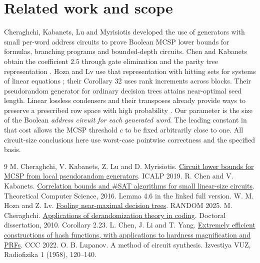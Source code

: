 \documentclass[11pt]{article}
\begin{document}
\section{Related work and scope}
Cheraghchi, Kabanets, Lu and Myrisiotis \cite{cklm} developed the use of generators with small per-word address circuits to prove Boolean MCSP lower bounds for formulas, branching programs and bounded-depth circuits. Chen and Kabanets obtain the coefficient $2.5$ through gate elimination and the parity tree representation \cite{ck}. Hoza and Lv use that representation with hitting sets for systems of linear equations \cite{hl}; their Corollary 32 uses rank increments across blocks. Their pseudorandom generator for ordinary decision trees attains near-optimal seed length. Linear lossless condensers and their transposes already provide ways to preserve a prescribed row space with high probability \cite{cher}. Our parameter is the size of the Boolean \emph{address circuit for each generated word}. The leading constant in that cost allows the MCSP threshold $c$ to be fixed arbitrarily close to one. All circuit-size conclusions here use worst-case pointwise correctness and the specified basis.
\begin{thebibliography}{9}
 M. Cheraghchi, V. Kabanets, Z. Lu and D. Myrisiotis. \href{https://doi.org/10.4230/LIPIcs.ICALP.2019.39}{Circuit lower bounds for MCSP from local pseudorandom generators}. ICALP 2019.
 R. Chen and V. Kabanets. \href{https://www2.cs.sfu.ca/~kabanets/papers/linsize-eccc.pdf}{Correlation bounds and \#SAT algorithms for small linear-size circuits}. Theoretical Computer Science, 2016. Lemma 4.6 in the linked full version.
 W. M. Hoza and Z. Lv. \href{https://doi.org/10.4230/LIPIcs.APPROX/RANDOM.2025.35}{Fooling near-maximal decision trees}. RANDOM 2025.
 M. Cheraghchi. \href{https://eccc.weizmann.ac.il/resources/pdf/astaneh.pdf}{Applications of derandomization theory in coding}. Doctoral dissertation, 2010. Corollary 2.23.
 L. Chen, J. Li and T. Yang. \href{https://doi.org/10.4230/LIPIcs.CCC.2022.23}{Extremely efficient constructions of hash functions, with applications to hardness magnification and PRFs}. CCC 2022.
 O. B. Lupanov. A method of circuit synthesis. Izvestiya VUZ, Radiofizika 1 (1958), 120--140.
\end{thebibliography}
\end{document}
